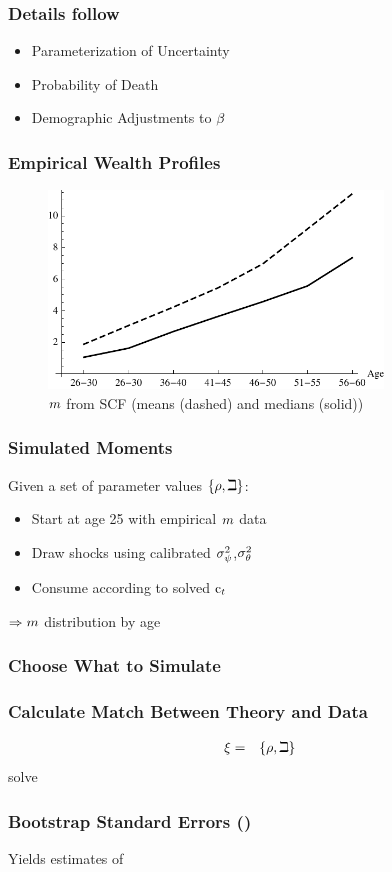 \documentclass{beamer}
\begin{document}
\begin{frame}
\frametitle{Details follow~\cite{cagettiWprofiles}}
\begin{itemize}
\item Parameterization of Uncertainty
\item Probability of Death
\item Demographic Adjustments to $\beta$
\end{itemize}
\end{frame}

\begin{frame}
\frametitle{Empirical Wealth Profiles}
\begin{figure}
    \includegraphics[width=3.5in]{./Figures/PlotMeanMedianSCFcollegeGrads.pdf}
    \caption{$m$ from SCF (means (dashed) and medians (solid))}
    \label{fig:MeanMedianSCF}
\end{figure}
\end{frame}

\begin{frame}
\frametitle{Simulated Moments}

Given a set of parameter values $\{\rho,\beth\}$:
\begin{itemize}
\item Start at age 25 with empirical $m$ data
\item Draw shocks using calibrated $\sigma^{2}_{\psi}$,$\sigma^{2}_{\theta}$
\item Consume according to solved $\mathrm{c}_{t}$
\end{itemize}
\pause 
$\Rightarrow m$ distribution by age
\end{frame}

\begin{frame}
\frametitle{Choose What to Simulate}

\end{frame}

\begin{frame}
\frametitle{Calculate Match Between Theory and Data}
\begin{eqnarray}
\xi & = & \{\rho,\beth\}
\end{eqnarray}
solve


\end{frame}
\begin{frame}
\frametitle{Bootstrap Standard Errors (\cite{horowitzBootstrap})}

Yields estimates of 


\end{frame}
\end{document}
